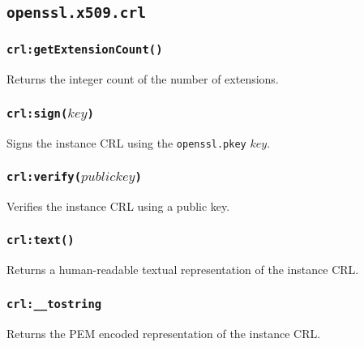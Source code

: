 \documentclass[11pt, oneside]{memoir}
\newcommand*{\fn}[1]{\texttt{#1}\xspace}
\newcommand*{\module}[1]{\texttt{#1}\xspace}
\newcounter{toccols}
\newenvironment{Module}[1]{
	\subsection{\texttt{#1}}
	\addtocontents{toc}{
		\protect\begin{multicols}{\value{toccols}}
	}
}{
	\addtocontents{toc}{\protect\end{multicols}}
}
\begin{document}
\begin{Module}{openssl.x509.crl}
\subsubsection[\fn{crl:getExtensionCount}]{\fn{crl:getExtensionCount()}}

Returns the integer count of the number of extensions.

\subsubsection[\fn{crl:sign}]{\fn{crl:sign($key$)}}

Signs the instance CRL using the \module{openssl.pkey} $key$.

\subsubsection[\fn{crl:verify}]{\fn{crl:verify($publickey$)}}

Verifies the instance CRL using a public key.

\subsubsection[\fn{crl:text}]{\fn{crl:text()}}

Returns a human-readable textual representation of the instance CRL.

\subsubsection[\fn{crl:\_\_tostring}]{\fn{crl:\_\_tostring}}

Returns the PEM encoded representation of the instance CRL.

\end{Module}
\end{document}
